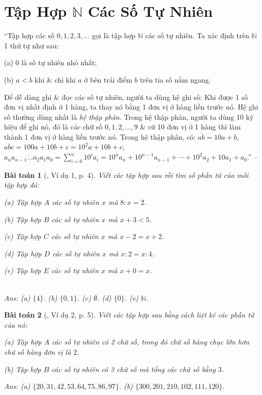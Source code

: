 \documentclass{article}
\numberwithin{equation}{section}
\newtheorem{baitoan}{Bài toán}
\begin{document}
\section{Tập Hợp $\mathbb{N}$ Các Số Tự Nhiên}
``Tập hợp các số $0,1,2,3,\ldots$ gọi là tập hợp $\mathbb{N}$ các số tự nhiên. Ta xác định trên $\mathbb{N}$ 1 thứ tự như sau:
\begin{enumerate*}
	\item[(a)] $0$ là số tự nhiên nhỏ nhất;
	\item[(b)] $a < b$ khi \& chỉ khi $a$ ở bên trái điểm $b$ trên tia số nằm ngang.
\end{enumerate*}
Để dễ dàng ghi \& đọc các số tự nhiên, người ta dùng hệ ghi số: Khi được 1 số đơn vị nhất định ở 1 hàng, ta thay nó bằng 1 đơn vị ở hàng liền trước nó. Hệ ghi số thường dùng nhất là \textit{hệ thập phân}. Trong hệ thập phân, người ta dùng 10 ký hiệu để ghi nó, đó là các chữ số $0,1,2,\ldots,9$ \& cứ 10 đơn vị ở 1 hàng thì làm thành 1 đơn vị ở hàng liền trước nó. Trong hệ thập phân, có: $\overline{ab} = 10a + b$, $\overline{abc} = 100a + 10b + c = 10^2a + 10b + c$, $\overline{a_na_{n-1}\ldots a_2a_1a_0} = \sum_{i=0}^n 10^ia_i = 10^na_n + 10^{n-1}a_{n-1} + \cdots + 10^2a_2 + 10a_1 + a_0$.'' -- \cite[\S1, p. 4]{Binh_Toan_6_tap_1}

\begin{baitoan}[\cite{Binh_Toan_6_tap_1}, Ví dụ 1, p. 4]
	Viết các tập hợp sau rồi tìm số phần tử của mỗi tập hợp đó:
	\begin{enumerate*}
		\item[(a)] Tập hợp $A$ các số tự nhiên $x$ mà $8:x = 2$.
		\item[(b)] Tập hợp $B$ các số tự nhiên $x$ mà $x + 3 < 5$.
		\item[(c)] Tập hợp $C$ các số tự nhiên $x$ mà $x - 2 = x + 2$.
		\item[(d)] Tập hợp $D$ các số tự nhiên $x$ mà $x:2 = x:4$.
		\item[(e)] Tập hợp $E$ các số tự nhiên $x$ mà $x + 0 = x$.
	\end{enumerate*}\\\mbox{}\hfill\textsf{Ans:} (a) $\{4\}$. (b) $\{0,1\}$. (c) $\emptyset$. (d) $\{0\}$. (e) $\mathbb{N}$.
\end{baitoan}

\begin{baitoan}[\cite{Binh_Toan_6_tap_1}, Ví dụ 2, p. 5]
	Viết các tập hợp sau bằng cách liệt kê các phần tử của nó:
	\begin{enumerate*}
		\item[(a)] Tập hợp $A$ các số tự nhiên có 2 chữ số, trong đó chữ số hàng chục lớn hơn chữ số hàng đơn vị là $2$.
		\item[(b)] Tập hợp $B$ các số tự nhiên có 3 chữ số mà tổng các chữ số bằng $3$.
	\end{enumerate*}\hfill\textsf{Ans:} (a) $\{20,31,42,53,64,75,86,97\}$. (b) $\{300,201,210,102,111,120\}$.
\end{baitoan}
\end{document}

